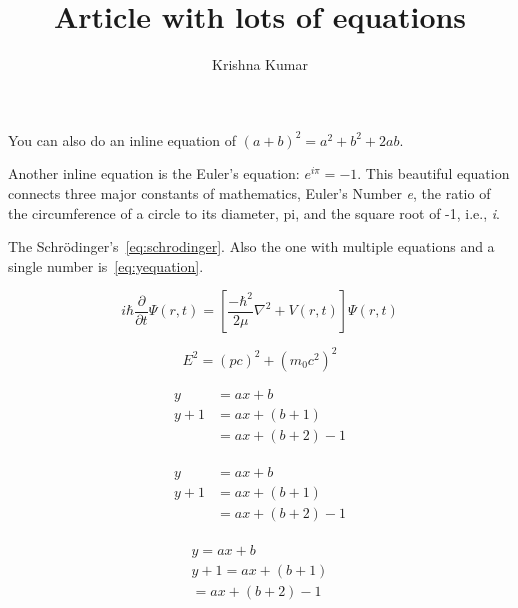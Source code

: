 \documentclass[times]{article}
\title{Article with lots of equations}
\author{Krishna Kumar}
\date{}
\begin{document}
\maketitle

You can also do an inline equation of $(a+b)^2 = a^2 + b^2 + 2ab$.

Another inline equation is the Euler's equation: $e^{i\pi}=-1$. This beautiful equation connects three major constants of mathematics, Euler's Number \textit{e}, the ratio of the circumference of a circle to its diameter, pi, and the square root of -1, i.e., \textit{i}.


The Schr\"{o}dinger's~\cref{eq:schrodinger}. Also the one with multiple 
equations and a single number is~\cref{eq:yequation}.

\begin{equation}
i \hbar \frac{\partial}{\partial t} \Psi(r,t) = 
\left[\frac{-\hbar^2}{2\mu}\nabla^2+V(r,t)\right]\Psi(r,t)
\label{eq:schrodinger}
\end{equation}

\begin{equation*}
E^2 = (pc)^2 + (m_0 c^2)^2
\end{equation*}


\begin{align}
	y   & =  ax+b \nonumber\\
	y+1 & = ax+(b+1)\\
	    & = ax+(b+2)-1
\end{align}


\begin{align}
\label{eq:yequation}
\begin{aligned}
	y   & =  ax+b \\
	y+1 & = ax+(b+1)\\
	    & = ax+(b+2)-1
\end{aligned}
\end{align}



\begin{gather}
	y     =  ax+b \nonumber\\
	y+1   =  ax+(b+1)\\
	      =  ax+(b+2)-1
\end{gather}
\end{document}
